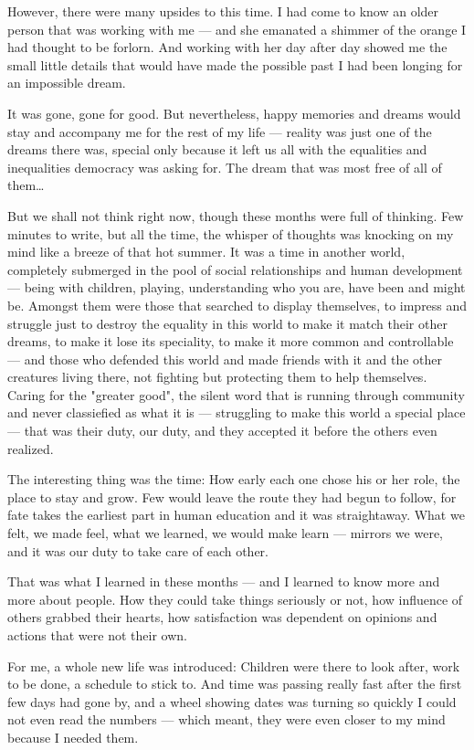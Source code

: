 However, there were many upsides to this time. I had come to know an older person that was working with me --- and she emanated a shimmer of the orange I had thought to be forlorn. And working with her day after day showed me the small little details that would have made the possible past I had been longing for an impossible dream.

It was gone, gone for good. But nevertheless, happy memories and dreams would stay and accompany me for the rest of my life --- reality was just one of the dreams there was, special only because it left us all with the equalities and inequalities democracy was asking for. The dream that was most free of all of them\ldots

But we shall not think right now, though these months were full of thinking. Few minutes to write, but all the time, the whisper of thoughts was knocking on my mind like a breeze of that hot summer. It was a time in another world, completely submerged in the pool of social relationships and human development --- being with children, playing, understanding who you are, have been and might be. Amongst them were those that searched to display themselves, to impress and struggle just to destroy the equality in this world to make it match their other dreams, to make it lose its speciality, to make it more common and controllable --- and those who defended this world and made friends with it and the other creatures living there, not fighting but protecting them to help themselves. Caring for the "greater good", the silent word that is running through community and never classiefied as what it is --- struggling to make this world a special place --- that was their duty, our duty, and they accepted it before the others even realized.

The interesting thing was the time: How early each one chose his or her role, the place to stay and grow. Few would leave the route they had begun to follow, for fate takes the earliest part in human education and it was straightaway. What we felt, we made feel, what we learned, we would make learn --- mirrors we were, and it was our duty to take care of each other.

That was what I learned in these months --- and I learned to know more and more about people. How they could take things seriously or not, how influence of others grabbed their hearts, how satisfaction was dependent on opinions and actions that were not their own.

For me, a whole new life was introduced: Children were there to look after, work to be done, a schedule to stick to. And time was passing really fast after the first few days had gone by, and a wheel showing dates was turning so quickly I could not even read the numbers --- which meant, they were even closer to my mind because I needed them.


